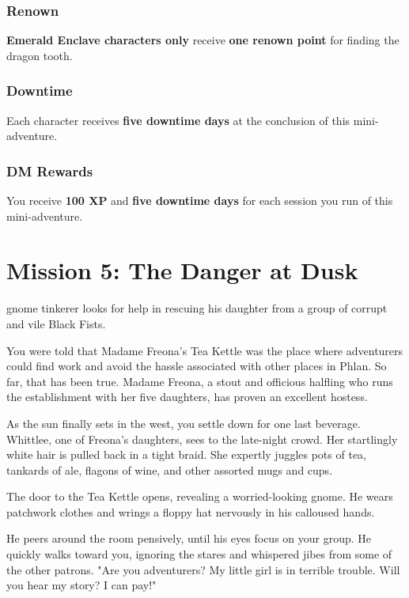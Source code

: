 \documentclass[10pt,a4paper,twoside,bg=print,twocolumn,openany,nodeprecatedcode]{dndbook}
\begin{document}
\subsection{Renown}
\textbf{Emerald Enclave characters only} receive \textbf{one renown point} for finding the dragon tooth.

\subsection{Downtime}
Each character receives \textbf{five downtime days} at the conclusion of this mini-adventure.

\subsection{DM Rewards}
You receive \textbf{100 XP} and \textbf{five downtime days} for each session you run of this mini-adventure.

\chapter{Mission 5: The Danger at Dusk}
 gnome tinkerer looks for help in rescuing his daughter from a group of corrupt and vile Black Fists.


\begin{DndReadAloud}{}
You were told that Madame Freona's Tea Kettle was the place where adventurers could find work and avoid the hassle associated with other places in Phlan. So far, that has been true. Madame Freona, a stout and officious halfling who runs the establishment with her five daughters, has proven an excellent hostess.

As the sun finally sets in the west, you settle down for one last beverage. Whittlee, one of Freona's daughters, sees to the late-night crowd. Her startlingly white hair is pulled back in a tight braid. She expertly juggles pots of tea, tankards of ale, flagons of wine, and other assorted mugs and cups.

The door to the Tea Kettle opens, revealing a worried-looking gnome. He wears patchwork clothes and wrings a floppy hat nervously in his calloused hands.

He peers around the room pensively, until his eyes focus on your group. He quickly walks toward you, ignoring the stares and whispered jibes from some of the other patrons. "Are you adventurers? My little girl is in terrible trouble. Will you hear my story? I can pay!"

\end{DndReadAloud}
\end{document}
